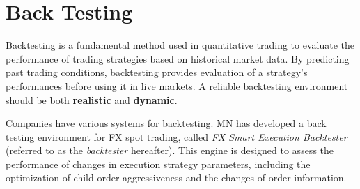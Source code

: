 \section{Back Testing}
Backtesting is a fundamental method used in quantitative trading to evaluate the performance of trading strategies based on historical market data. By predicting past trading conditions, backtesting provides evaluation of a strategy's performances before using it in live markets. A reliable backtesting environment should be both \textbf{realistic} and \textbf{dynamic}.

Companies have various systems for backtesting. MN has developed a back testing environment for FX spot trading, called \textit{FX Smart Execution Backtester} (referred to as the \textit{backtester} hereafter). This engine is designed to assess the performance of changes in execution strategy parameters, including the optimization of child order aggressiveness and the changes of order information. 

